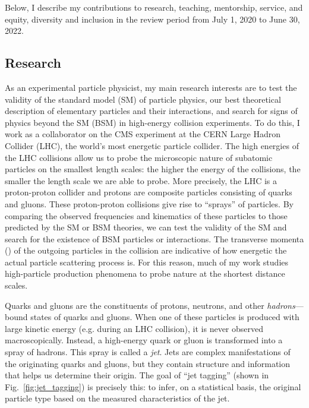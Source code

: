 \documentclass[11pt,letterpaper,notitlepage]{article}
\begin{document}
\pagestyle{fancyplain}

Below, I describe my contributions to research, teaching, mentorship, service, and equity, diversity and inclusion in the review period from July 1, 2020 to June 30, 2022.
\vspace{-1ex}
\subsection*{Research}

As an experimental particle physicist, my main research interests are to test the validity of the standard model (SM) of particle physics, our best theoretical description of elementary particles and their interactions, and search for signs of physics beyond the SM (BSM) in high-energy collision experiments.
To do this, I work as a collaborator on the CMS experiment at the CERN Large Hadron Collider (LHC), the world's most energetic particle collider.
The high energies of the LHC collisions allow us to probe the microscopic nature of subatomic particles on the smallest length scales: the higher the energy of the collisions, the smaller the length scale we are able to probe.
More precisely, the LHC is a proton-proton collider and protons are composite particles consisting of quarks and gluons.
These proton-proton collisions give rise to ``sprays'' of particles.
By comparing the observed frequencies and kinematics of these particles to those predicted by the SM or BSM theories, we can test the validity of the SM and search for the existence of BSM particles or interactions.
The transverse momenta (\pt) of the outgoing particles in the collision are indicative of how energetic the actual particle scattering process is.
For this reason, much of my work studies high-\pt particle production phenomena to probe nature at the shortest distance scales.

Quarks and gluons are the constituents of protons, neutrons, and other \emph{hadrons}---bound states of quarks and gluons.
When one of these particles is produced with large kinetic energy (e.g. during an LHC collision), it is never observed macroscopically.
Instead, a high-energy quark or gluon is transformed into a spray of hadrons.
This spray is called a \emph{jet}.
Jets are complex manifestations of the originating quarks and gluons, but they contain structure and information that helps us determine their origin.
The goal of ``jet tagging'' (shown in Fig.~\ref{fig:jet_tagging}) is precisely this: to infer, on a statistical basis, the original particle type based on the measured characteristics of the jet.
\end{document}

